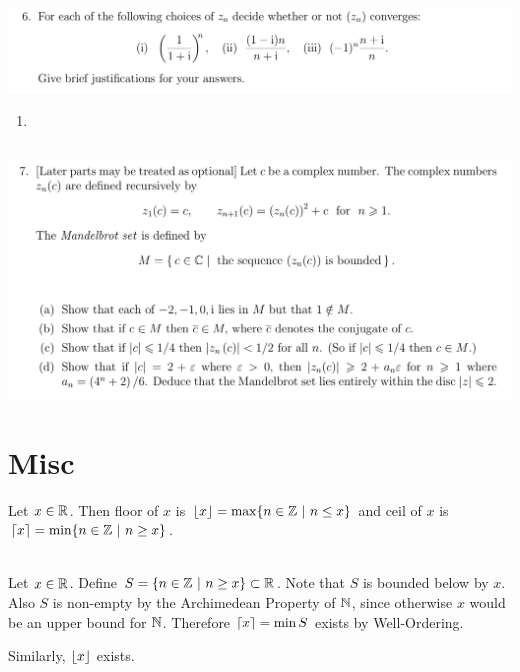 \documentclass[12pt]{article}
\begin{document}
\newpage
\subsection{}
\begin{mdframed}
\includegraphics[width=400pt]{img/oxford-M2-analysis-I-3-6.png}
\end{mdframed}

\begin{enumerate}[label=(\roman*)]
\item
\end{enumerate}

\newpage
\subsection{}
\begin{mdframed}
\includegraphics[width=400pt]{img/oxford-M2-analysis-I-3-7.png}
\end{mdframed}



\newpage
\section{Misc}
\newpage
\begin{definition*}
  Let $x \in \mathbb{R}$. Then floor of $x$ is $\lfloor x\rfloor = \max\{n \in \mathbb{Z} ~|~ n \leq x\}$ and ceil of $x$
  is $\lceil x\rceil = \min\{n \in \mathbb{Z} ~|~ n \geq x\}$.
\end{definition*}

\begin{theorem*}~\\
  Let $x \in \mathbb{R}$. Define $S = \{n \in \mathbb{Z} ~|~ n \geq x\} \subset \mathbb{R}$. Note that $S$ is bounded below
  by $x$. Also $S$ is non-empty by the Archimedean Property of $\mathbb{N}$, since otherwise $x$ would be
  an upper bound for $\mathbb{N}$. Therefore $\lceil x\rceil = \min S$ exists by Well-Ordering.

  Similarly, $\lfloor x\rfloor$ exists.
\end{theorem*}
\end{document}
